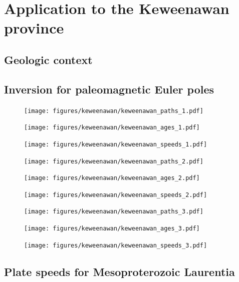 \documentclass[preprint,12pt,authoryear]{elsarticle}
\begin{document}
\section{Application to the Keweenawan province}
\label{sec:keweenawan}
\subsection{Geologic context}
\citet{swanson2009no}
\subsection{Inversion for paleomagnetic Euler poles}
\clearpage
\begin{figure}
\texttt{[image: figures/keweenawan/keweenawan\_paths\_1.pdf]}
\caption{}
\label{fig:keweenawan_paths_1}
\end{figure}
\begin{figure}
\texttt{[image: figures/keweenawan/keweenawan\_ages\_1.pdf]}
\caption{}
\label{fig:keweenawan_ages_1}
\end{figure}
\begin{figure}
\texttt{[image: figures/keweenawan/keweenawan\_speeds\_1.pdf]}
\caption{}
\label{fig:keweenawan_speeds_1}
\end{figure}
\begin{figure}
\texttt{[image: figures/keweenawan/keweenawan\_paths\_2.pdf]}
\caption{}
\label{fig:keweenawan_paths_2}
\end{figure}
\begin{figure}
\texttt{[image: figures/keweenawan/keweenawan\_ages\_2.pdf]}
\caption{}
\label{fig:keweenawan_ages_2}
\end{figure}
\begin{figure}
\texttt{[image: figures/keweenawan/keweenawan\_speeds\_2.pdf]}
\caption{}
\label{fig:keweenawan_speeds_2}
\end{figure}
\begin{figure}
\texttt{[image: figures/keweenawan/keweenawan\_paths\_3.pdf]}
\caption{}
\label{fig:keweenawan_paths_3}
\end{figure}
\begin{figure}
\texttt{[image: figures/keweenawan/keweenawan\_ages\_3.pdf]}
\caption{}
\label{fig:keweenawan_ages_3}
\end{figure}
\begin{figure}
\texttt{[image: figures/keweenawan/keweenawan\_speeds\_3.pdf]}
\caption{}
\label{fig:keweenawan_speeds_3}
\end{figure}
\subsection{Plate speeds for Mesoproterozoic Laurentia}
\end{document}

